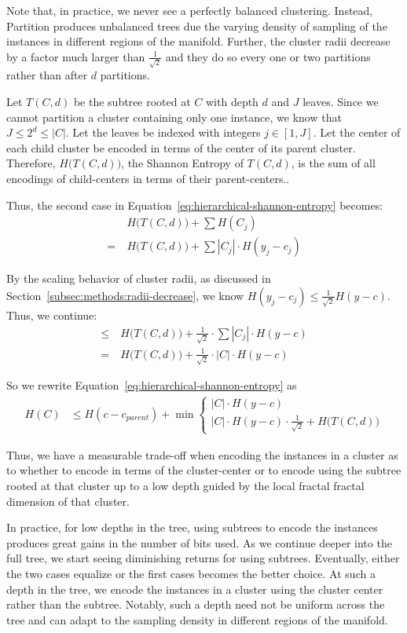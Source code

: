 Note that, in practice, we never see a perfectly balanced clustering.
Instead, Partition produces unbalanced trees due the varying density of sampling of the instances in different regions of the manifold.
Further, the cluster radii decrease by a factor much larger than $\frac{1}{\sqrt{2}}$ and they do so every one or two partitions rather than after $d$ partitions.

Let $T(C, d)$ be the subtree rooted at $C$ with depth $d$ and $J$ leaves.
Since we cannot partition a cluster containing only one instance, we know that $J \leq 2^d \leq |C|$.
Let the leaves be indexed with integers $j \in [1, J]$.
Let the center of each child cluster be encoded in terms of the center of its parent cluster.
Therefore, $H \big( T(C, d) \big)$, the Shannon Entropy of $T(C, d)$, is the sum of all encodings of child-centers in terms of their parent-centers..

Thus, the second case in Equation~\ref{eq:hierarchical-shannon-entropy} becomes:
\begin{align*}
    & H \big( T(C, d) \big) + \sum H(C_j) \\
    = \ & H \big( T(C, d) \big) + \sum |C_j| \cdot H(y_j - c_j)
\end{align*}

By the scaling behavior of cluster radii, as discussed in Section~\ref{subsec:methods:radii-decrease}, we know $H(y_j - c_j) \leq \frac{1}{\sqrt{2}} H(y - c)$.
Thus, we continue:
\begin{align*}
    \leq \ & H \big( T(C, d) \big) + \frac{1}{\sqrt{2}} \cdot \sum |C_j| \cdot H(y - c) \\
    = \ & H \big( T(C, d) \big) + \frac{1}{\sqrt{2}} \cdot |C| \cdot H(y - c)
\end{align*}

So we rewrite Equation~\ref{eq:hierarchical-shannon-entropy} as
\begin{align}
    \label{eq:hierarchical-shannon-entropy-2}
    H(C) &\leq H(c - c_{parent}) + \min \begin{cases}
        |C| \cdot H(y - c) \\
        |C| \cdot H(y - c) \cdot \frac{1}{\sqrt{2}} + H \big( T(C, d) \big) 
    \end{cases}
\end{align}

Thus, we have a measurable trade-off when encoding the instances in a cluster as to whether to encode in terms of the cluster-center or to encode using the subtree rooted at that cluster up to a low depth guided by the local fractal fractal dimension of that cluster.

In practice, for low depths in the tree, using subtrees to encode the instances produces great gains in the number of bits used.
As we continue deeper into the full tree, we start seeing diminishing returns for using subtrees.
Eventually, either the two cases equalize or the first cases becomes the better choice.
At such a depth in the tree, we encode the instances in a cluster using the cluster center rather than the subtree.
Notably, such a depth need not be uniform across the tree and can adapt to the sampling density in different regions of the manifold.